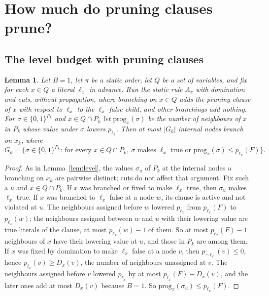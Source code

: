\documentclass[11pt,a4paper]{article}
\newtheorem{lemma}[theorem]{Lemma}
\theoremstyle{remark}
\begin{document}
\section{How much do pruning clauses prune?}\label{sec:prune-analysis}

\subsection{The level budget with pruning clauses}

\begin{lemma}\label{lem:level-prune}
Let $B=1$, let $\pi$ be a static order, let $Q$ be a set of variables, and fix
for each $x\in Q$ a literal $\ell_x$ in advance. Run the static rule $A_\pi$
with domination and cuts, without propagation, where branching on $x\in Q$ adds
the pruning clause of $x$ with respect to $\ell_x$ to the $\ell_x$-false child,
and other branchings add nothing. For $\sigma\in\{0,1\}^{P_k}$ and
$x\in Q\cap P_k$ let $\mathrm{prog}_x(\sigma)$ be the number of neighbours of
$x$ in $P_k$ whose value under $\sigma$ lowers $p_{\ell_x}$. Then at most
$|G_k|$ internal nodes branch on $x_k$, where
\[
 G_k=\bigl\{\sigma\in\{0,1\}^{P_k}:\ \text{for every }x\in Q\cap P_k,\
 \sigma\text{ makes }\ell_x\text{ true or }
 \mathrm{prog}_x(\sigma)\le p_{\ell_x}(F)\bigr\}.
\]
\end{lemma}

\begin{proof}
As in Lemma~\ref{lem:level}, the values $\sigma_u$ of $P_k$ at the internal
nodes $u$ branching on $x_k$ are pairwise distinct; cuts do not affect that
argument. Fix such a $u$ and $x\in Q\cap P_k$.
If $x$ was branched or fixed to make $\ell_x$ true, then $\sigma_u$ makes
$\ell_x$ true.
If $x$ was branched to $\ell_x$ false at a node $w$, its clause is active and
not violated at $u$. The neighbours assigned before $w$ lowered $p_{\ell_x}$
from $p_{\ell_x}(F)$ to $p_{\ell_x}(w)$; the neighbours assigned between $w$
and $u$ with their lowering value are true literals of the clause, at most
$p_{\ell_x}(w)-1$ of them. So at most $p_{\ell_x}(F)-1$ neighbours of $x$ have
their lowering value at $u$, and those in $P_k$ are among them.
If $x$ was fixed by domination to make $\ell_x$ false at a node $v$, then
$p_{\neg\ell_x}(v)\le0$, hence $p_{\ell_x}(v)\ge D_x(v)$, the number of
neighbours unassigned at $v$. The neighbours assigned before $v$ lowered
$p_{\ell_x}$ by at most $p_{\ell_x}(F)-D_x(v)$, and the later ones add at most
$D_x(v)$ because $B=1$. So $\mathrm{prog}_x(\sigma_u)\le p_{\ell_x}(F)$.
\end{proof}
\end{document}
